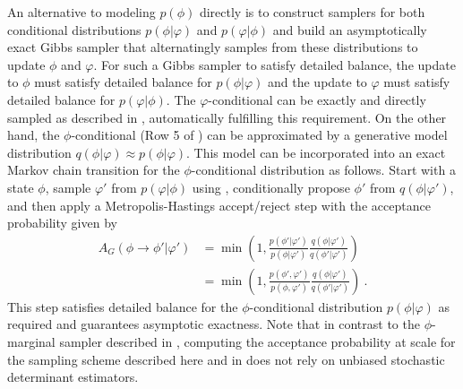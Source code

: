 \documentclass[aps,prd,twocolumn,nofootinbib,superscriptaddress,preprintnumbers]{revtex4-1}
\begin{document}
An alternative to modeling $p(\phi)$ directly is to construct samplers for both conditional distributions $p(\phi|\varphi)$ and $p(\varphi|\phi)$ and build an asymptotically exact Gibbs sampler that alternatingly samples from these distributions to update $\phi$ and $\varphi$. For such a Gibbs sampler to satisfy detailed balance, the update to $\phi$ must satisfy detailed balance for $p(\phi|\varphi)$ and the update to $\varphi$ must satisfy detailed balance for $p(\varphi|\phi)$. The $\varphi$-conditional can be exactly and directly sampled as described in , automatically fulfilling this requirement. On the other hand, the $\phi$-conditional (Row 5 of ) can be approximated by a generative model distribution $q(\phi|\varphi) \approx p(\phi|\varphi)$. This model can be incorporated into an exact Markov chain transition for the $\phi$-conditional distribution as follows. Start with a state $\phi$, sample $\varphi'$ from $p(\varphi|\phi)$ using , conditionally propose $\phi'$ from $q(\phi|\varphi')$, and then apply a Metropolis-Hastings accept/reject step with the acceptance probability given by
%
\begin{equation}\label{eq:gibbs-acc}
\begin{aligned}
    A_G(\phi \rightarrow \phi'|\varphi') &= \min\left(1, \frac{p(\phi'|\varphi')}{p(\phi|\varphi')}\frac{q(\phi|\varphi')}{q(\phi'|\varphi')} \right) \\
    &= \min\left(1, \frac{p(\phi',\varphi')}{p(\phi,\varphi')}\frac{q(\phi|\varphi')}{q(\phi'|\varphi')} \right)\ .
\end{aligned}
\end{equation}
%
This step satisfies detailed balance for the $\phi$-conditional distribution $p(\phi|\varphi)$ as required and guarantees asymptotic exactness. Note that in contrast to the $\phi$-marginal sampler described in , computing the acceptance probability at scale for the sampling scheme described here and in  does not rely on unbiased stochastic determinant estimators.
\end{document}
